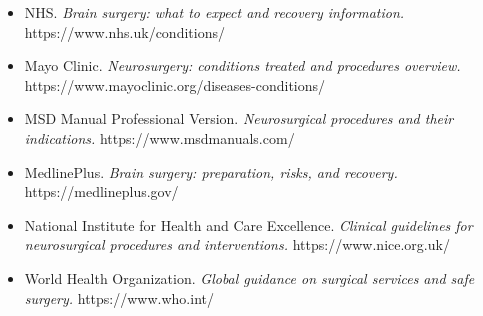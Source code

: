 \begin{itemize}
    \item NHS. \textit{Brain surgery: what to expect and recovery information.} https://www.nhs.uk/conditions/
    \item Mayo Clinic. \textit{Neurosurgery: conditions treated and procedures overview.} https://www.mayoclinic.org/diseases-conditions/
    \item MSD Manual Professional Version. \textit{Neurosurgical procedures and their indications.} https://www.msdmanuals.com/
    \item MedlinePlus. \textit{Brain surgery: preparation, risks, and recovery.} https://medlineplus.gov/
    \item National Institute for Health and Care Excellence. \textit{Clinical guidelines for neurosurgical procedures and interventions.} https://www.nice.org.uk/
    \item World Health Organization. \textit{Global guidance on surgical services and safe surgery.} https://www.who.int/
\end{itemize}
